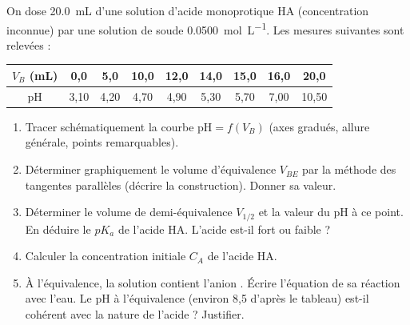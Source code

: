 \documentclass[11pt]{article}
\begin{document}
\begin{exercice}
On dose \SI{20,0}{mL} d'une solution d'acide monoprotique HA (concentration inconnue) par une solution de soude  \SI{0,0500}{mol.L^{-1}}. Les mesures suivantes sont relevées :

\begin{center}
\begin{tabular}{|c|c|c|c|c|c|c|c|c|}
\hline
$V_B$ (mL) & 0,0 & 5,0 & 10,0 & 12,0 & 14,0 & 15,0 & 16,0 & 20,0 \\ \hline
pH & 3,10 & 4,20 & 4,70 & 4,90 & 5,30 & 5,70 & 7,00 & 10,50 \\ \hline
\end{tabular}
\end{center}

\begin{enumerate}
    \item Tracer schématiquement la courbe $\text{pH} = f(V_B)$ (axes gradués, allure générale, points remarquables).
    \item Déterminer graphiquement le volume d'équivalence $V_{BE}$ par la méthode des tangentes parallèles (décrire la construction). Donner sa valeur.
    \item Déterminer le volume de demi-équivalence $V_{1/2}$ et la valeur du pH à ce point. En déduire le $pK_a$ de l'acide HA. L'acide est-il fort ou faible ?
    \item Calculer la concentration initiale $C_A$ de l'acide HA.
    \item À l'équivalence, la solution contient l'anion . Écrire l'équation de sa réaction avec l'eau. Le pH à l'équivalence (environ 8,5 d'après le tableau) est-il cohérent avec la nature de l'acide ? Justifier.
\end{enumerate}
\end{exercice}
\end{document}
